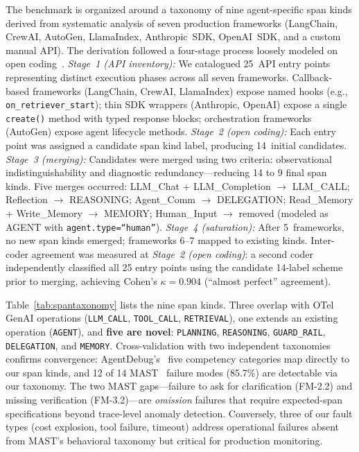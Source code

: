 \documentclass[sigconf,screen]{acmart}
\begin{document}
The benchmark is organized around a taxonomy of nine agent-specific span
kinds derived from systematic analysis of seven production
frameworks (LangChain, CrewAI, AutoGen, LlamaIndex, Anthropic~SDK,
OpenAI~SDK, and a custom manual API).  The derivation followed a
four-stage process loosely modeled on open coding~\cite{strauss_corbin}.
\emph{Stage~1 (API inventory):} We catalogued 25~API entry points
representing distinct execution phases across all seven frameworks.
Callback-based frameworks (LangChain, CrewAI, LlamaIndex) expose named
hooks (e.g., \texttt{on\_retriever\_start}); thin SDK wrappers
(Anthropic, OpenAI) expose a single \texttt{create()} method with typed
response blocks; orchestration frameworks (AutoGen) expose agent
lifecycle methods.
\emph{Stage~2 (open coding):} Each entry point was assigned a candidate
span kind label, producing 14~initial candidates.
\emph{Stage~3 (merging):} Candidates were merged using two criteria:
observational indistinguishability and diagnostic redundancy---reducing
14 to 9 final span kinds.  Five merges occurred: LLM\_Chat +
LLM\_Completion $\to$ LLM\_CALL; Reflection $\to$ REASONING;
Agent\_Comm $\to$ DELEGATION; Read\_Memory + Write\_Memory $\to$ MEMORY;
Human\_Input $\to$ removed (modeled as AGENT with
\texttt{agent.type=``human''}).
\emph{Stage~4 (saturation):} After 5~frameworks, no new span kinds
emerged; frameworks 6--7 mapped to existing kinds.  Inter-coder
agreement was measured at \emph{Stage~2 (open coding)}: a second coder
independently classified all 25 entry points using the candidate
14-label scheme prior to merging, achieving Cohen's
$\kappa = 0.904$ (``almost perfect'' agreement).

Table~\ref{tab:spantaxonomy} lists the nine span kinds.  Three overlap
with OTel GenAI operations (\texttt{LLM\_CALL}, \texttt{TOOL\_CALL},
\texttt{RETRIEVAL}), one extends an existing operation (\texttt{AGENT}),
and \textbf{five are novel}: \texttt{PLANNING}, \texttt{REASONING},
\texttt{GUARD\_RAIL}, \texttt{DELEGATION}, and \texttt{MEMORY}.
Cross-validation with two independent taxonomies confirms convergence:
AgentDebug's~\cite{agentdebug} five competency categories map directly
to our span kinds, and 12 of 14 MAST~\cite{mast} failure modes (85.7\%)
are detectable via our taxonomy.
The two MAST gaps---failure to ask for clarification (FM-2.2) and
missing verification (FM-3.2)---are \emph{omission} failures that
require expected-span specifications beyond trace-level anomaly
detection.  Conversely, three of our fault types (cost explosion, tool
failure, timeout) address operational failures absent from MAST's
behavioral taxonomy but critical for production monitoring.
\end{document}
